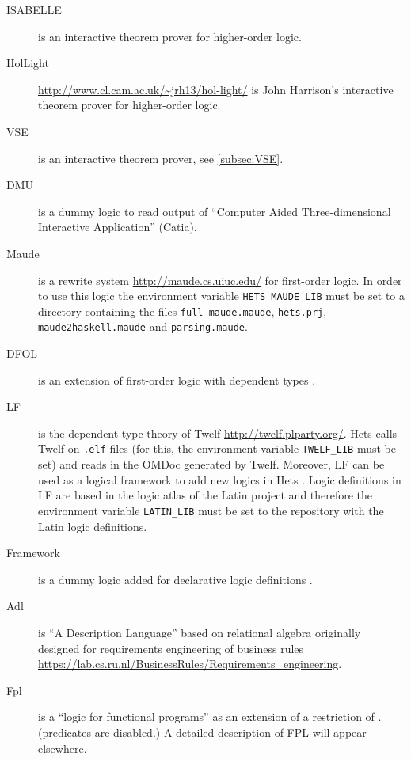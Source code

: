 \documentclass{article}
\newcommand{\normalTEXTSC}[2]{{#1\scriptsize#2}}
\newcommand     {\Isabelle}{\normalTEXTSC{I}{SABELLE}\xspace}
\begin{document}
\begin{description}
\item[\Isabelle] \cite{NipPauWen02} is an interactive theorem prover
  for higher-order logic.

\item[HolLight] \url{http://www.cl.cam.ac.uk/~jrh13/hol-light/}
  is John Harrison's interactive theorem prover
  for higher-order logic.

\item[VSE] is an interactive theorem prover, see \ref{subsec:VSE}.

\item[DMU] is a dummy logic to read output of ``Computer Aided
  Three-dimensional Interactive Application'' (Catia).

\item[Maude] is a rewrite system \url{http://maude.cs.uiuc.edu/} for
  first-order logic. In order to use this logic the environment variable
  \verb+HETS_MAUDE_LIB+ must be set to a directory containing the files
  \verb+full-maude.maude+, \verb+hets.prj+, \verb+maude2haskell.maude+ and
  \verb+parsing.maude+.

\item[DFOL] is an extension of first-order logic with dependent types \cite{rabe:dfol:06}.

\item [LF] is the dependent type theory of Twelf \url{http://twelf.plparty.org/}. Hets
      calls Twelf on \verb+.elf+ files (for this, the environment variable
      \verb+TWELF_LIB+ must be set) and reads in the OMDoc generated by Twelf.
      Moreover, LF can be used as a logical framework to add new logics in Hets \cite{CHK+2011a}.
      Logic definitions in LF are based in the logic atlas of the Latin project \cite{project:latin}
      and therefore the environment variable \verb+LATIN_LIB+ must be set to the
      repository with the Latin logic definitions.

\item[Framework] is a dummy logic added for declarative logic definitions \cite{CHK+2011a}.

\item[Adl] is ``A Description Language'' based on relational algebra originally
  designed for requirements engineering of business rules
  \url{https://lab.cs.ru.nl/BusinessRules/Requirements_engineering}.

\item[Fpl] is a ``logic for functional programs'' as an extension of a
  restriction of \CASL. (\CASL predicates are disabled.)
  A detailed description of FPL will appear elsewhere.
\end{description}
\end{document}
